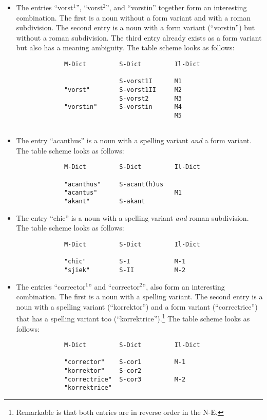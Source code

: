 \begin{itemize}
  \item The entries ``vorst$^1$'', ``vorst$^2$'',
        and ``vorstin'' together form an interesting combination. The first is
        a noun without a form variant and with a roman subdivision. The second
        entry is a noun with a form variant (``vorstin'') but without a roman 
        subdivision. The third entry already exists as a form variant but
        also has a meaning ambiguity. The table scheme looks as follows:\newpage
        \begin{verbatim}
             M-Dict         S-Dict         Il-Dict
 
                            S-vorst1I      M1
             "vorst"        S-vorst1II     M2
                            S-vorst2       M3
             "vorstin"      S-vorstin      M4
                                           M5
             
        \end{verbatim}
  \item The entry ``acanthus'' is 
        a noun with a spelling variant {\em and} a form variant. 
        The table scheme looks as follows:\\
        \begin{verbatim}
             M-Dict         S-Dict         Il-Dict
 
             "acanthus"     S-acant(h)us
             "acantus"                     M1
             "akant"        S-akant
        \end{verbatim}
  \item The entry ``chic'' is 
        a noun with a spelling variant {\em and} roman subdivision. 
        The table scheme looks as follows:\\
        \begin{verbatim}
             M-Dict         S-Dict         Il-Dict
 
             "chic"         S-I            M-1
             "sjiek"        S-II           M-2
        \end{verbatim}
  \item The entries ``corrector$^1$'' and ``corrector$^2$'',
        also form an interesting combination. The first is
        a noun with a spelling variant. The second entry is a noun with a 
        spelling variant (``korrektor'') and a form variant (``correctrice'') 
        that has a spelling variant too (``korrektrice'').\footnote{Remarkable 
        is that both entries are in reverse order in the N-E.}
        The table scheme looks as follows:\\
        \begin{verbatim}
             M-Dict         S-Dict         Il-Dict
 
             "corrector"    S-cor1         M-1
             "korrektor"    S-cor2         
             "correctrice"  S-cor3         M-2
             "korrektrice"  
        \end{verbatim}
\end{itemize}
 
